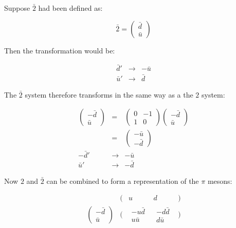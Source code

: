 Suppose $\bar{2}$ had been defined as:

\[
  \bar{2} = 
  \left(
    \begin{array}{c}
    \bar{d} \\
    \bar{u}
    \end{array}
   \right)
\]

Then the transformation would be:

\begin{eqnarray*}
  \bar{d}' & \to & -\bar{u} \\
  \bar{u}' & \to & \bar{d}
\end{eqnarray*}

The $\bar{2}$ system therefore transforms in the same way as a the $2$ system:

\begin{eqnarray*}
  \left(
    \begin{array}{c}
    -\bar{d} \\
    \bar{u}
    \end{array}
  \right)
  & = &
  \left(
    \begin{array}{cc}
    0 & -1 \\
    1 & 0
    \end{array}
  \right)
  \left(
    \begin{array}{c}
    -\bar{d} \\
    \bar{u}
    \end{array}
  \right)
  \\
  & = &
  \left(
    \begin{array}{c}
    -\bar{u} \\
    -\bar{d}
    \end{array}
  \right) \\
  -\bar{d}' & \to & -\bar{u} \\
  \bar{u}'  & \to & -\bar{d}
\end{eqnarray*}

Now $2$ and $\bar{2}$ can be combined to form a representation of the $\pi$ mesons:

\[
  \begin{array}{ccccc}
           & ( & u         & d         & ) \\
  \left( \begin{array}{c}-\bar{d} \\ \bar{u} \end{array} \right) & \Bigg( 
  & \begin{array}{c} -u\bar{d} \\ u\bar{u} \end{array}
  & \begin{array}{c} -d\bar{d} \\ d\bar{u} \end{array} & \Bigg) \\
  \end{array}
\]


